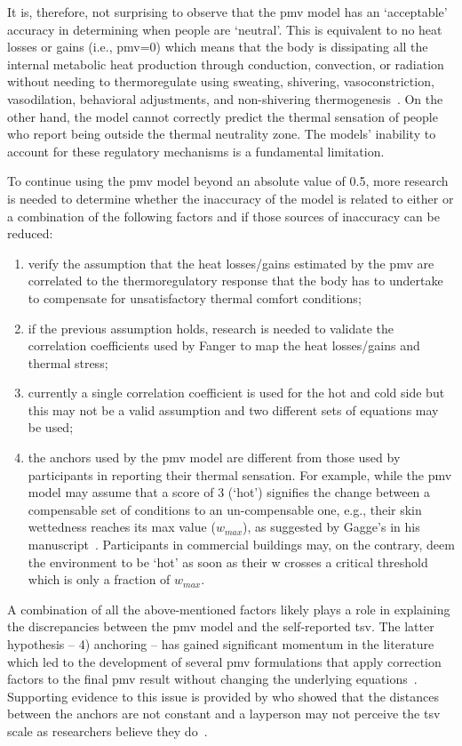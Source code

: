 It is, therefore, not surprising to observe that the \ac{pmv} model has an `acceptable' accuracy in determining when people are `neutral'.
This is equivalent to no heat losses or gains (i.e., \ac{pmv}=0) which means that the body is dissipating all the internal metabolic heat production through conduction, convection, or radiation without needing to thermoregulate using sweating, shivering, vasoconstriction, vasodilation, behavioral adjustments, and non-shivering thermogenesis~\cite{ romanovsky_thermoregulation_2018}.
On the other hand, the model cannot correctly predict the thermal sensation of people who report being outside the thermal neutrality zone.
The models' inability to account for these regulatory mechanisms is a fundamental limitation.

To continue using the \ac{pmv} model beyond an absolute value of \num{0.5}, more research is needed to determine whether the inaccuracy of the model is related to either or a combination of the following factors and if those sources of inaccuracy can be reduced:
\begin{enumerate}
    \item verify the assumption that the heat losses/gains estimated by the \ac{pmv} are correlated to the thermoregulatory response that the body has to undertake to compensate for unsatisfactory thermal comfort conditions;
    \item if the previous assumption holds, research is needed to validate the correlation coefficients used by Fanger to map the heat losses/gains and thermal stress;
    \item currently a single correlation coefficient is used for the hot and cold side but this may not be a valid assumption and two different sets of equations may be used;
    \item the anchors used by the \ac{pmv} model are different from those used by participants in reporting their thermal sensation.
    For example, while the \ac{pmv} model may assume that a score of 3 (`hot') signifies the change between a compensable set of conditions to an un-compensable one, e.g., their skin wettedness reaches its max value ($w_{max}$), as suggested by Gagge's in his manuscript~\cite{GaggeSET}.
    Participants in commercial buildings may, on the contrary, deem the environment to be `hot' as soon as their \ac{w} crosses a critical threshold which is only a fraction of $w_{max}$.
\end{enumerate}

A combination of all the above-mentioned factors likely plays a role in explaining the discrepancies between the \ac{pmv} model and the self-reported \ac{tsv}.
The latter hypothesis -- 4) anchoring -- has gained significant momentum in the literature which led to the development of several \ac{pmv} formulations that apply correction factors to the final \ac{pmv} result without changing the underlying equations~\cite{Yao2022, Toftum2002}.
Supporting evidence to this issue is provided by  who showed that the distances between the anchors are not constant and a layperson may not perceive the \ac{tsv} scale as researchers believe they do~\cite{schweiker2019scales, schweiker2020evaluating}.


